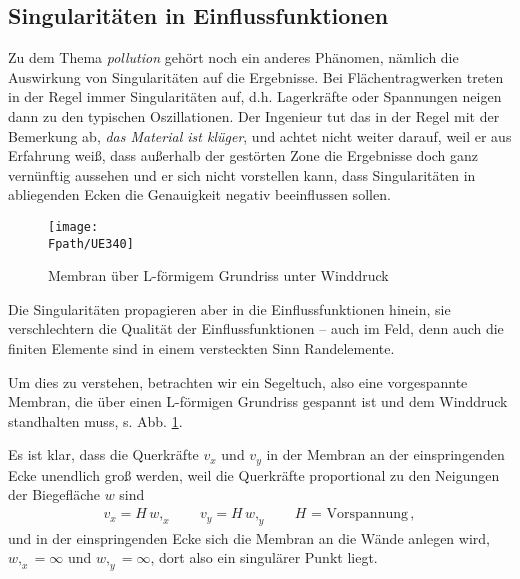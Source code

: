 {\textcolor{sectionTitleBlue}{\section{Singularit\"{a}ten in Einflussfunktionen}}\label{SingInf}
Zu dem Thema  {\em pollution\/} geh\"{o}rt noch ein anderes Ph\"{a}nomen, n\"{a}mlich die Auswirkung von Singularit\"{a}ten auf die Ergebnisse. Bei Fl\"{a}chentragwerken treten in der Regel immer Singularit\"{a}ten auf, d.h. Lagerkr\"{a}fte oder Spannungen neigen dann zu den typischen  Oszillationen. Der Ingenieur tut das in der Regel mit der Bemerkung ab, {\em \glq das Material ist kl\"{u}ger\grq{}\/}, und achtet nicht weiter darauf, weil er aus Erfahrung wei{\ss}, dass au{\ss}erhalb der gest\"{o}rten Zone die Ergebnisse doch ganz vern\"{u}nftig aussehen und er sich nicht vorstellen kann, dass Singularit\"{a}ten in abliegenden Ecken die Genauigkeit negativ beeinflussen sollen.
\begin{figure}
\centering
\texttt{[image: \\Fpath/UE340]}
\caption{Membran \"{u}ber L-f\"{o}rmigem Grundriss unter Winddruck}
\label{U171}%
\end{figure}%

Die Singularit\"{a}ten propagieren aber in die Einflussfunktionen hinein, sie verschlechtern die Qualit\"{a}t der Einflussfunktionen -- auch \glq im Feld\grq{}, denn auch die finiten Elemente sind in einem versteckten Sinn Randelemente.

Um dies zu verstehen, betrachten wir ein Segeltuch, also eine vorgespannte Membran, die \"{u}ber einen L-f\"{o}rmigen Grundriss gespannt ist und dem Winddruck standhalten muss, s. Abb. \ref{U171}.

Es ist klar, dass die Querkr\"{a}fte $v_x$ und $v_y$ in der Membran an der einspringenden Ecke unendlich gro{\ss} werden, weil die Querkr\"{a}fte proportional zu den Neigungen der Biegefl\"{a}che $w$ sind
\begin{align}
v_x = H\,w,_x \qquad v_y = H\,w,_y \qquad \text{$H$ = Vorspannung}\,,
\end{align}
und in der einspringenden Ecke sich die Membran an die W\"{a}nde anlegen wird, $w,_x = \infty$ und $w,_y = \infty$, dort also ein singul\"{a}rer Punkt liegt.

}
